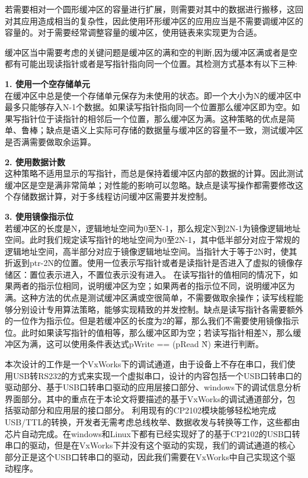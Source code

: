 若需要相对一个圆形缓冲区的容量进行扩展，则需要对其中的数据进行搬移，这回对其应用造成相当的复杂性，因此使用环形缓冲区的应用应当是不需要调缓冲区的容量的。对于需要经常调整容量的缓冲区，使用链表来实现更为合适。

缓冲区当中需要考虑的关键问题是缓冲区的满和空的判断,因为缓冲区满或者是空都有可能出现读指针或者是写指针指向同一个位置。其检测方式基本有以下三种:
	
	\noindent \textbf{1. 使用一个空存储单元}\\
	在缓冲区中总是使一个存储单元保存为未使用的状态。即一个大小为N的缓冲区中最多只能够存入N-1个数据。如果读写指针指向同一个位置那么缓冲区即为空。如果写指针位于读指针的相邻后一个位置，那么缓冲区为满。这种策略的优点是简单、鲁棒；缺点是语义上实际可存储的数据量与缓冲区的容量不一致，测试缓冲区是否满需要做取余运算。
	
	\noindent \textbf{2. 使用数据计数}\\
	这种策略不适用显示的写指针，而总是保持着缓冲区内部的数据的计算。因此测试缓冲区是空是满非常简单；对性能的影响可以忽略。缺点是读写操作都需要修改这个存储数据计算，对于多线程访问缓冲区需要并发控制。
	
	\noindent \textbf{3. 使用镜像指示位}\\
	若缓冲区的长度是N，逻辑地址空间为0至N-1，那么规定N到2N-1为镜像逻辑地址空间。此时我们规定读写指针的地址空间为0至2N-1，其中低半部分对应于常规的逻辑地址空间，高半部分对应于镜像逻辑地址空间。当指针大于等于2N时，使其折返到ptr-2N的位置。使用一位表示写指针或者是读指针是否进入了虚拟的镜像存储区：置位表示进入，不置位表示没有进入。
	在读写指针的值相同的情况下，如果两者的指示位相同，说明缓冲区为空；如果两者的指示位不同，说明缓冲区为满。这种方法的优点是测试缓冲区满或空很简单，不需要做取余操作；读写线程能够分别设计专用算法策略，能够实现精致的并发控制。缺点是读写指针各需要额外的一位作为指示位。但是若缓冲区的长度为2的幂，那么我们不需要使用镜像指示位。此时如果读写指针的值相等，那么缓冲区即为空；若读写指针相差N，那么缓冲区为满，这可以使用条件表达式pWrite == (pRead \^ N) 来进行判断。 








本次设计的工作是一个VxWorks下的调试通道，由于设备上不存在串口，我们使用USB转RS232的方式来实现一个虚拟串口，设计的内容包括一个USB口转串口的驱动部分、基于USB口转串口驱动的应用层接口部分、windows下的调试信息分析界面部分。其中的重点在于本论文将要描述的基于VxWorks的调试通道部分，包括驱动部分和应用层的接口部分。
利用现有的CP2102模块能够轻松地完成USB/TTL的转换，开发者无需考虑总线枚举、数据收发与转换等工作，这些都由芯片自动完成。在windows和Linux下都有已经实现好了的基于CP2102的USB口转串口的驱动，但是在VxWorks下并没有这个驱动的实现，我们的调试通道的核心部分正是这个USB口转串口的驱动，因此我们需要在VxWorks中自己实现这个驱动程序。


